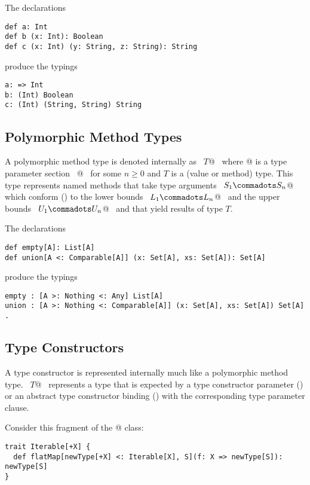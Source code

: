\example The declarations
\begin{lstlisting}
def a: Int
def b (x: Int): Boolean
def c (x: Int) (y: String, z: String): String
\end{lstlisting}
produce the typings
\begin{lstlisting}
a: => Int
b: (Int) Boolean
c: (Int) (String, String) String
\end{lstlisting}

\subsection{Polymorphic Method Types}
\label{sec:poly-types}

A polymorphic method type is denoted internally as ~\lstinline@[$\tps\,$]$T$@~ where
\lstinline@[$\tps\,$]@ is a type parameter section 
~\lstinline@[$a_1$ >: $L_1$ <: $U_1 \commadots a_n$ >: $L_n$ <: $U_n$]@~ 
for some $n \geq 0$ and $T$ is a
(value or method) type.  This type represents named methods that
take type arguments ~\lstinline@$S_1 \commadots S_n$@~ which
conform () to the lower bounds
~\lstinline@$L_1 \commadots L_n$@~ and the upper bounds
~\lstinline@$U_1 \commadots U_n$@~ and that yield results of type $T$.

\example The declarations
\begin{lstlisting}
def empty[A]: List[A]
def union[A <: Comparable[A]] (x: Set[A], xs: Set[A]): Set[A]
\end{lstlisting}
produce the typings
\begin{lstlisting}
empty : [A >: Nothing <: Any] List[A]
union : [A >: Nothing <: Comparable[A]] (x: Set[A], xs: Set[A]) Set[A]  .
\end{lstlisting}

\subsection{Type Constructors} %
\label{sec:higherkinded-types}
A type constructor is represented internally much like a polymorphic method type.
~\lstinline@[$\pm$ $a_1$ >: $L_1$ <: $U_1 \commadots \pm a_n$ >: $L_n$ <: $U_n$] $T$@~ represents a type that is expected by a type constructor parameter () or an abstract type constructor binding () with the corresponding type parameter clause.

\example Consider this fragment of the \lstinline@Iterable[+X]@ class:
\begin{lstlisting}
trait Iterable[+X] {
  def flatMap[newType[+X] <: Iterable[X], S](f: X => newType[S]): newType[S]
}
\end{lstlisting}

